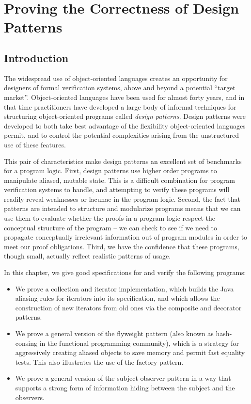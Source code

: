 \chapter{Proving the Correctness of Design Patterns}

\section{Introduction}

The widespread use of object-oriented languages creates an opportunity
for designers of formal verification systems, above and beyond a
potential ``target market''. Object-oriented languages have been used
for almost forty years, and in that time practitioners have developed
a large body of informal techniques for structuring object-oriented
programs called \emph{design patterns}\cite{gof}.  Design patterns
were developed to both take best advantage of the flexibility
object-oriented languages permit, and to control the potential
complexities arising from the unstructured use of these features.

This pair of characteristics make design patterns an excellent set of
benchmarks for a program logic.  First, design patterns use higher
order programs to manipulate aliased, mutable state. This is a
difficult combination for program verification systems to handle, and
attempting to verify these programs will readily reveal weaknesses or
lacunae in the program logic. Second, the fact that patterns are
intended to structure and modularize programs means that we can use
them to evaluate whether the proofs in a program logic respect the
conceptual structure of the program -- we can check to see if we need
to propagate conceptually irrelevant information out of program
modules in order to meet our proof obligations. Third, we have the
confidence that these programs, though small, actually reflect
realistic patterns of usage.

In this chapter, we give good specifications for and verify the
following programs:

\begin{itemize}
\item We prove a collection and iterator implementation, which builds
  the Java aliasing rules for iterators into its specification, and
  which allows the construction of new iterators from old ones via the
  composite and decorator patterns.  

\item We prove a general version of the flyweight pattern (also known as
  hash-consing in the functional programming community), which is a
  strategy for aggressively creating aliased objects to save memory
  and permit fast equality tests. This also illustrates the use of the
  factory pattern.

\item We prove a general version of the subject-observer pattern in a
  way that supports a strong form of information hiding between the
  subject and the observers.
\end{itemize}

